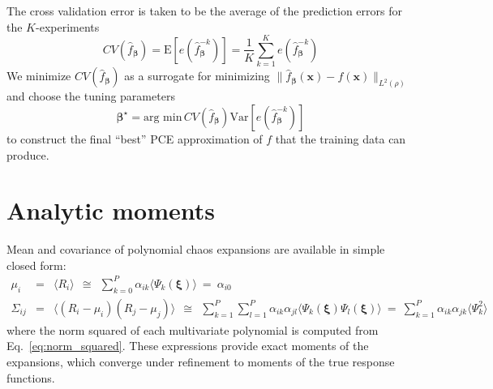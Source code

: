 The cross validation error is taken to be the average of the prediction errors for the $K$-experiments
\[
CV(\hat{f}_{\boldsymbol{\beta}}) = \mathrm{E}[e(\hat{f}_{\boldsymbol{\beta}}^{-k})] = \frac{1}{K}\sum_{k=1}^K e(\hat{f}_{\boldsymbol{\beta}}^{-k})
\]
We minimize $CV(\hat{f}_{\boldsymbol{\beta}})$ as a surrogate for minimizing
$\| \hat{f}_{\boldsymbol{\beta}}(\mathbf{x})-f(\mathbf{x})\|_{L^2(\rho)}$ and choose the tuning parameters 
\begin{equation}
\label{eq:optimal_tuning-parameters}
\boldsymbol{\beta}^\star = \text{arg min}\, CV(\hat{f}_{\boldsymbol{\beta}})\mathrm{Var}[e(\hat{f}_{\boldsymbol{\beta}}^{-k})]
\end{equation}
to construct the final ``best'' PCE approximation of $f$ that the training data can produce. 

\section{Analytic moments} \label{uq:expansion:moment}

Mean and covariance of polynomial chaos expansions are available
in simple closed form:
\begin{eqnarray}
\mu_i      &=& \langle R_i \rangle ~~\cong~~ \sum_{k=0}^P \alpha_{ik} \langle 
\Psi_k(\boldsymbol{\xi}) \rangle ~=~ \alpha_{i0} \label{eq:mean_pce} \\
\Sigma_{ij} &=& \langle (R_i - \mu_i)(R_j - \mu_j) \rangle ~~\cong~~ 
\sum_{k=1}^P \sum_{l=1}^P \alpha_{ik} \alpha_{jl}
\langle \Psi_k(\boldsymbol{\xi}) \Psi_l(\boldsymbol{\xi}) \rangle ~=~
\sum_{k=1}^P \alpha_{ik}\alpha_{jk} \langle \Psi^2_k \rangle~~~~~~~~ \label{eq:covar_pce} 
\end{eqnarray}
where the norm squared of each multivariate polynomial is computed
from Eq.~\ref{eq:norm_squared}.  These expressions provide exact moments 
of the expansions, which converge under refinement to moments of the 
true response functions.

